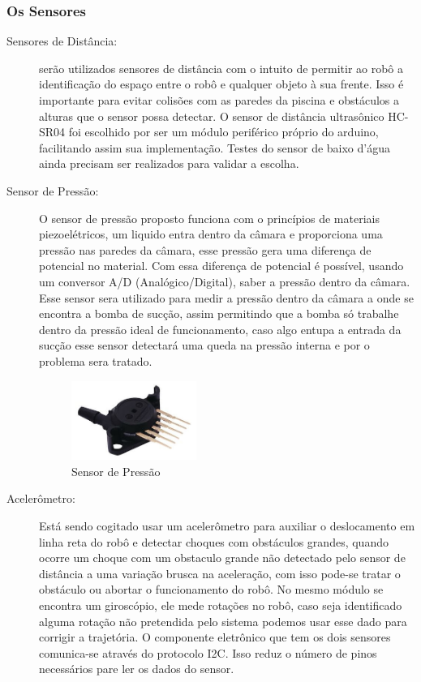 \subsubsection{Os Sensores}
\begin{description}
\item[Sensores de Distância:] serão utilizados sensores de distância com o intuito de permitir ao robô a identificação do espaço entre o robô e qualquer objeto à sua frente. Isso é importante para evitar colisões com as paredes da piscina e obstáculos a alturas que o sensor possa detectar. O sensor de distância ultrasônico \textsf{HC-SR04} foi escolhido  por ser um módulo periférico próprio do arduino, facilitando assim sua implementação. Testes do sensor de baixo d'água ainda precisam ser realizados para validar a escolha.
\item[Sensor de Pressão:] O sensor de pressão proposto funciona com o princípios de materiais piezoelétricos, um liquido entra dentro da câmara e proporciona uma pressão nas paredes da câmara, esse pressão gera uma diferença de potencial no material. Com essa diferença de potencial é possível, usando um conversor A/D (Analógico/Digital), saber a pressão dentro da câmara. Esse sensor sera utilizado para medir a pressão dentro da câmara a onde se encontra a bomba de sucção, assim permitindo que a bomba só trabalhe dentro da pressão ideal de funcionamento, caso algo entupa a entrada da sucção esse sensor detectará  uma queda na pressão interna e por \software o problema sera tratado.
\par
\begin{figure}[h]
  \centering
  \includegraphics[width=0.4\textwidth]{figures/pressure-sensor.png}
  \caption{Sensor de Pressão}
  \label{fig:a}
\end{figure}
\FloatBarrier
\par
\item[Acelerômetro:] Está sendo cogitado usar um acelerômetro para auxiliar o deslocamento em linha reta do robô e detectar choques com obstáculos grandes, quando ocorre um choque com um obstaculo grande não detectado pelo sensor de distância a uma variação brusca na aceleração, com isso pode-se tratar o obstáculo ou abortar o funcionamento do robô. No mesmo módulo se encontra um giroscópio, ele mede rotações no robô, caso seja identificado alguma rotação não pretendida pelo sistema podemos usar esse dado para corrigir a trajetória. O componente eletrônico que tem os dois sensores comunica-se através do protocolo I2C. Isso reduz o número de pinos necessários pare ler os dados do sensor.

\end{description}
